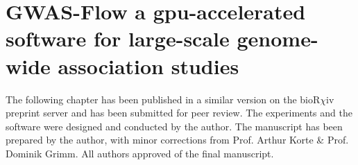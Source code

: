 
\chapter{GWAS-Flow a gpu-accelerated software for large-scale genome-wide association studies}

\label{Chapter2} %


The following chapter has been published in a similar version on the bioR$\chi$iv preprint
server \cite{Freudenthal_2019} and has been submitted for peer review. The experiments and
the software were designed and conducted by the author. The manuscript has been prepared
by the author, with minor corrections from Prof. Arthur Korte \& Prof. Dominik Grimm. All
authors approved of the final manuscript.


